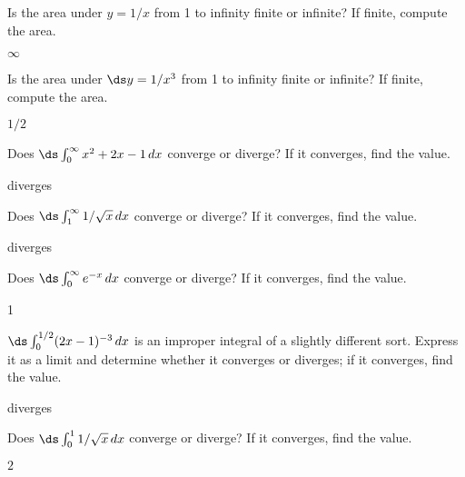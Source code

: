 \begin{exercises}

\begin{exercise} Is the area under $y=1/x$ from 1 to infinity finite or
infinite? If finite, compute the area.
\begin{answer} $\infty$
\end{answer}\end{exercise}

\begin{exercise} Is the area under $\ds y=1/x^3$ from 1 to infinity finite or
infinite? If finite, compute the area.
\begin{answer} $1/2$
\end{answer}\end{exercise}

\begin{exercise} Does $\ds\int_0^\infty x^2+2x-1\,dx$ converge or diverge? If
it converges, find the value.
\begin{answer} diverges 
\end{answer}\end{exercise}

\begin{exercise} Does $\ds\int_1^\infty 1/\sqrt{x}\,dx$ converge or diverge? If
it converges, find the value.
\begin{answer} diverges
\end{answer}\end{exercise}

\begin{exercise} Does $\ds\int_0^\infty e^{-x }\,dx$ converge or diverge? If
it converges, find the value.
\begin{answer} 1
\end{answer}\end{exercise}

\begin{exercise} $\ds\int_0^{1/2} (2x-1)^{-3}\,dx$ is an improper integral of
a slightly different sort. Express it as a limit and determine whether
it converges or diverges; if 
it converges, find the value.
\begin{answer} diverges
\end{answer}\end{exercise}

\begin{exercise} Does $\ds\int_0^1 1/\sqrt{x}\,dx$ converge or diverge? If
it converges, find the value.
\begin{answer} $2$
\end{answer}\end{exercise}


\end{exercises}

